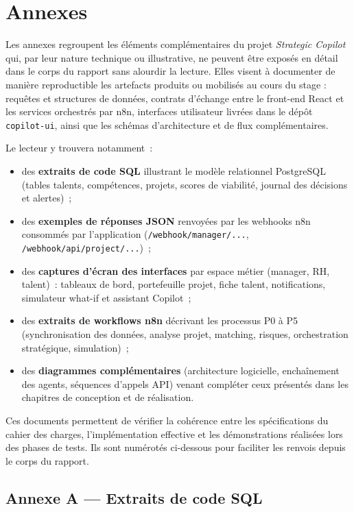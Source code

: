 \chapter*{Annexes}

Les annexes regroupent les éléments complémentaires du projet \emph{Strategic Copilot} qui, par leur nature technique ou illustrative, ne peuvent être exposés en détail dans le corps du rapport sans alourdir la lecture. Elles visent à documenter de manière reproductible les artefacts produits ou mobilisés au cours du stage : requêtes et structures de données, contrats d'échange entre le front-end React et les services orchestrés par n8n, interfaces utilisateur livrées dans le dépôt \texttt{copilot-ui}, ainsi que les schémas d'architecture et de flux complémentaires.

Le lecteur y trouvera notamment~:
\begin{itemize}
    \item des \textbf{extraits de code SQL} illustrant le modèle relationnel PostgreSQL (tables talents, compétences, projets, scores de viabilité, journal des décisions et alertes)~;
    \item des \textbf{exemples de réponses JSON} renvoyées par les webhooks n8n consommés par l'application (\texttt{/webhook/manager/...}, \texttt{/webhook/api/project/...})~;
    \item des \textbf{captures d'écran des interfaces} par espace métier (manager, RH, talent)~: tableaux de bord, portefeuille projet, fiche talent, notifications, simulateur what-if et assistant Copilot~;
    \item des \textbf{extraits de workflows n8n} décrivant les processus P0 à P5 (synchronisation des données, analyse projet, matching, risques, orchestration stratégique, simulation)~;
    \item des \textbf{diagrammes complémentaires} (architecture logicielle, enchaînement des agents, séquences d'appels API) venant compléter ceux présentés dans les chapitres de conception et de réalisation.
\end{itemize}

Ces documents permettent de vérifier la cohérence entre les spécifications du cahier des charges, l'implémentation effective et les démonstrations réalisées lors des phases de tests. Ils sont numérotés ci-dessous pour faciliter les renvois depuis le corps du rapport.

\section*{Annexe A --- Extraits de code SQL}
\label{annexe:sql}

